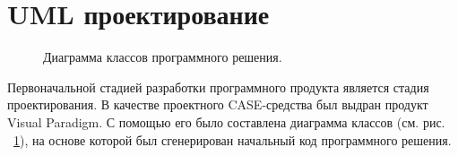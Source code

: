 \section{UML проектирование}

\begin{figure}[h]
\caption{Диаграмма классов программного решения.}
\label{ris:UML}
\end{figure}

Первоначальной стадией разработки программного продукта является стадия проектирования.
В качестве проектного CASE-средства был выдран продукт Visual Paradigm.
С помощью его было составлена диаграмма классов (см. рис. ~\ref{ris:UML}), на основе которой был сгенерирован начальный код программного решения.